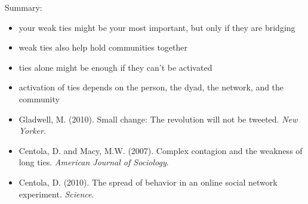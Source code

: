 \documentclass[aspectratio=169]{beamer}
\begin{document}
\begin{frame}

Summary:
\begin{itemize}
\item your weak ties might be your most important, but only if they are bridging 
\pause
\item weak ties also help hold communities together
\pause
\item ties alone might be enough if they can't be activated
\pause
\item activation of ties depends on the person, the dyad, the network, and the community
\end{itemize}


\end{frame}
\begin{frame}

\begin{itemize}
\item Gladwell, M. (2010). Small change: The revolution will not be tweeted. \textit{New Yorker}.
\item Centola, D. and Macy, M.W. (2007). Complex contagion and the weakness of long ties. \textit{American Journal of Sociology}.
\item Centola, D. (2010). The spread of behavior in an online social network experiment. \textit{Science}.
\end{itemize}

\end{frame}
\end{document}
